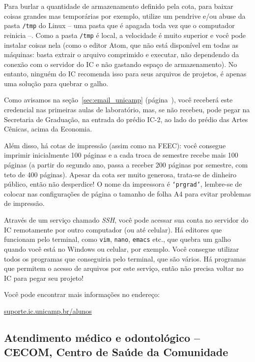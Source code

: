 Para burlar a quantidade de armazenamento definido pela cota, para baixar
coisas grandes mas temporárias por exemplo, utilize um pendrive e/ou abuse da
pasta \texttt{/tmp} do Linux -- uma pasta que é apagada toda vez que o
computador reinicia --. Como a pasta \texttt{/tmp} é local, a velocidade é
muito superior e você pode instalar coisas nela (como o editor Atom, que não
está disponível em todas as máquinas: basta extrair o arquivo comprimido e
executar, não dependendo da conexão com o servidor do IC e não gastando espaço
de armazenamento). No entanto, ninguém do IC recomenda isso para seus arquivos
de projetos, é apenas uma solução para quebrar o galho.

Como avisamos na seção~\ref{sec:email_unicamp}
(página~\pageref{sec:email_unicamp}), você receberá este credencial nas
primeiras aulas de laboratório, mas, se não recebeu, pode pegar na Secretaria
de Graduação, na entrada do prédio IC-2, ao lado do prédio das Artes Cênicas,
acima da Economia.

Além disso, há cotas de impressão (assim como na FEEC): você consegue imprimir
inicialmente 100 páginas e a cada troca de semestre recebe mais 100 páginas (a
partir do segundo ano, passa a receber 200 páginas por semestre, com teto de
400 páginas). Apesar da cota ser muito generosa, trata-se de dinheiro público,
então não desperdice! O nome da impressora é \texttt{`prgrad'}, lembre-se de
colocar nas configurações de página o tamanho de folha A4 para evitar problemas
de impressão.

Através de um serviço chamado \emph{SSH}, você pode acessar sua conta no
servidor do IC remotamente por outro computador (ou até celular). Há editores
que funcionam pelo terminal, como \texttt{vim}, \texttt{nano}, \texttt{emacs}
etc., que quebra um galho quando você está no Windows ou celular, por exemplo.
Você consegue utilizar todos os programas que conseguiria pelo terminal, que
são vários. Há programas que permitem o acesso de arquivos por este serviço,
então não precisa voltar no IC para pegar seu projeto!

Você pode encontrar mais informações no endereço:

\begin{center}
\url{suporte.ic.unicamp.br/alunos}
\end{center}

\subsection{Atendimento médico e odontológico -- CECOM, Centro de Saúde da
Comunidade}

